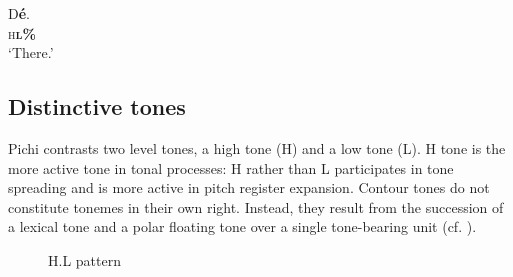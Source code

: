 \clearpage 

\ea\label{ex:key:46}
\gll    D\textbf{é}.\\
\textsc{h}\textbf{\textsc{l\%}}\\
\glt ‘There.’
\z

\subsection{Distinctive tones}
\largerpage[2]
Pichi contrasts two level tones, a high tone (H) and a low tone (L). H tone is the more active tone in tonal processes: H rather than L participates in tone spreading and is more active in pitch register expansion. Contour tones do not constitute tonemes in their own right. Instead, they result from the succession of a lexical tone and a polar floating tone over a single tone-bearing unit (cf. ). 



\begin{figure}[b]
\caption{H.L pattern}
\label{fig:key:3.5}
\end{figure}


